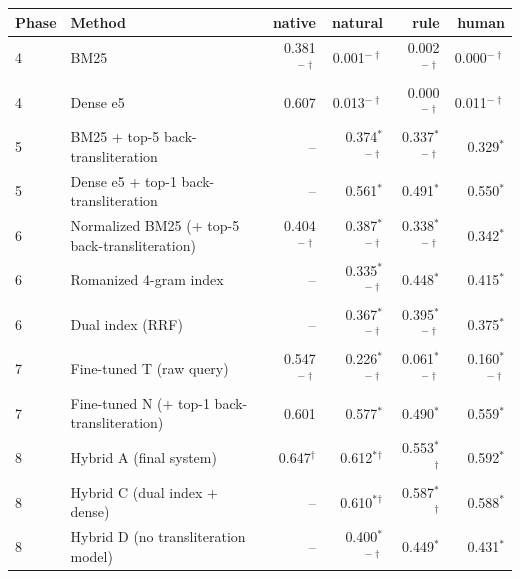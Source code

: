 \begin{tabular}{llrrrr}
\toprule
Phase & Method & native & natural & rule & human \\
\midrule
4 & BM25 & 0.381$^{-\dagger}$ & 0.001$^{-\dagger}$ & 0.002$^{-\dagger}$ & 0.000$^{-\dagger}$ \\
4 & Dense e5 & 0.607 & 0.013$^{-\dagger}$ & 0.000$^{-\dagger}$ & 0.011$^{-\dagger}$ \\
5 & BM25 + top-5 back-transliteration & -- & 0.374$^{*}$$^{-\dagger}$ & 0.337$^{*}$$^{-\dagger}$ & 0.329$^{*}$ \\
5 & Dense e5 + top-1 back-transliteration & -- & 0.561$^{*}$ & 0.491$^{*}$ & 0.550$^{*}$ \\
6 & Normalized BM25 (+ top-5 back-transliteration) & 0.404$^{-\dagger}$ & 0.387$^{*}$$^{-\dagger}$ & 0.338$^{*}$$^{-\dagger}$ & 0.342$^{*}$ \\
6 & Romanized 4-gram index & -- & 0.335$^{*}$$^{-\dagger}$ & 0.448$^{*}$ & 0.415$^{*}$ \\
6 & Dual index (RRF) & -- & 0.367$^{*}$$^{-\dagger}$ & 0.395$^{*}$$^{-\dagger}$ & 0.375$^{*}$ \\
7 & Fine-tuned T (raw query) & 0.547$^{-\dagger}$ & 0.226$^{*}$$^{-\dagger}$ & 0.061$^{*}$$^{-\dagger}$ & 0.160$^{*}$$^{-\dagger}$ \\
7 & Fine-tuned N (+ top-1 back-transliteration) & 0.601 & 0.577$^{*}$ & 0.490$^{*}$ & 0.559$^{*}$ \\
8 & Hybrid A (final system) & 0.647$^{\dagger}$ & 0.612$^{*}$$^{\dagger}$ & 0.553$^{*}$$^{\dagger}$ & 0.592$^{*}$ \\
8 & Hybrid C (dual index + dense) & -- & 0.610$^{*}$$^{\dagger}$ & 0.587$^{*}$$^{\dagger}$ & 0.588$^{*}$ \\
8 & Hybrid D (no transliteration model) & -- & 0.400$^{*}$$^{-\dagger}$ & 0.449$^{*}$ & 0.431$^{*}$ \\
\bottomrule
\end{tabular}
